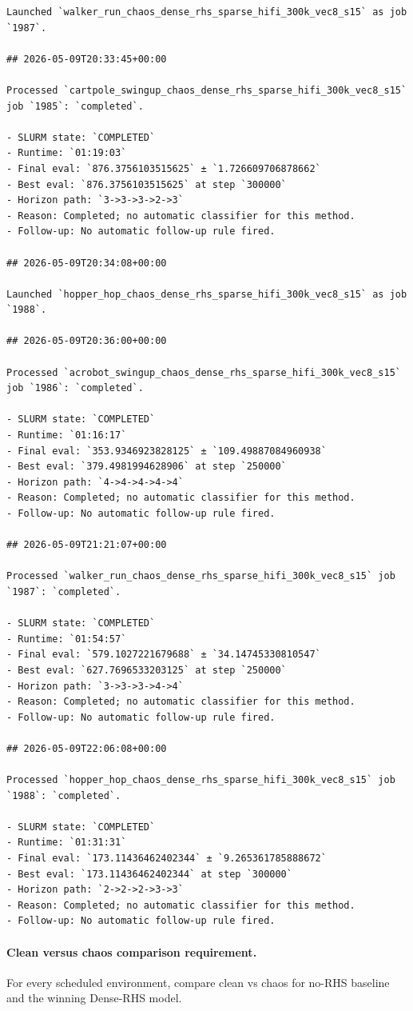 \begin{verbatim}
Launched `walker_run_chaos_dense_rhs_sparse_hifi_300k_vec8_s15` as job `1987`.

## 2026-05-09T20:33:45+00:00

Processed `cartpole_swingup_chaos_dense_rhs_sparse_hifi_300k_vec8_s15` job `1985`: `completed`.

- SLURM state: `COMPLETED`
- Runtime: `01:19:03`
- Final eval: `876.3756103515625` ± `1.726609706878662`
- Best eval: `876.3756103515625` at step `300000`
- Horizon path: `3->3->3->2->3`
- Reason: Completed; no automatic classifier for this method.
- Follow-up: No automatic follow-up rule fired.

## 2026-05-09T20:34:08+00:00

Launched `hopper_hop_chaos_dense_rhs_sparse_hifi_300k_vec8_s15` as job `1988`.

## 2026-05-09T20:36:00+00:00

Processed `acrobot_swingup_chaos_dense_rhs_sparse_hifi_300k_vec8_s15` job `1986`: `completed`.

- SLURM state: `COMPLETED`
- Runtime: `01:16:17`
- Final eval: `353.9346923828125` ± `109.49887084960938`
- Best eval: `379.4981994628906` at step `250000`
- Horizon path: `4->4->4->4->4`
- Reason: Completed; no automatic classifier for this method.
- Follow-up: No automatic follow-up rule fired.

## 2026-05-09T21:21:07+00:00

Processed `walker_run_chaos_dense_rhs_sparse_hifi_300k_vec8_s15` job `1987`: `completed`.

- SLURM state: `COMPLETED`
- Runtime: `01:54:57`
- Final eval: `579.1027221679688` ± `34.14745330810547`
- Best eval: `627.7696533203125` at step `250000`
- Horizon path: `3->3->3->4->4`
- Reason: Completed; no automatic classifier for this method.
- Follow-up: No automatic follow-up rule fired.

## 2026-05-09T22:06:08+00:00

Processed `hopper_hop_chaos_dense_rhs_sparse_hifi_300k_vec8_s15` job `1988`: `completed`.

- SLURM state: `COMPLETED`
- Runtime: `01:31:31`
- Final eval: `173.11436462402344` ± `9.265361785888672`
- Best eval: `173.11436462402344` at step `300000`
- Horizon path: `2->2->2->3->3`
- Reason: Completed; no automatic classifier for this method.
- Follow-up: No automatic follow-up rule fired.

\end{verbatim}

\paragraph{Clean versus chaos comparison requirement.}
For every scheduled environment, compare clean vs chaos for no-RHS baseline and the winning Dense-RHS model.
